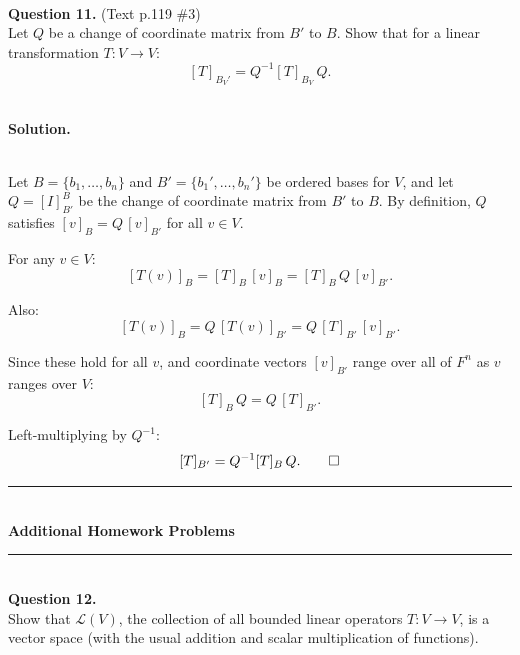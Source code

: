\documentclass{article}
\begin{document}
\bigskip


\hfill \break  $~\!\!$ \dotfill \medskip \\
\textbf{Question 11.} (Text p.119 \#3)\\
Let $Q$ be a change of coordinate matrix from $B'$ to $B$. Show that for a linear transformation $T: V \to V$:
\[
[T]_{B_V'} = Q^{-1}[T]_{B_V}\, Q.
\]

\noindent\\
\textbf{Solution.}\\
\quad\\
\begin{mdframed}[linewidth=1pt]
Let $B = \{b_1, \dots, b_n\}$ and $B' = \{b_1', \dots, b_n'\}$ be ordered bases for $V$, and let $Q = [I]_{B'}^{B}$ be the change of coordinate matrix from $B'$ to $B$. By definition, $Q$ satisfies $[v]_B = Q\,[v]_{B'}$ for all $v \in V$.

For any $v \in V$:
\[
[T(v)]_B = [T]_B\,[v]_B = [T]_B\, Q\, [v]_{B'}.
\]

Also:
\[
[T(v)]_B = Q\, [T(v)]_{B'} = Q\, [T]_{B'}\, [v]_{B'}.
\]

Since these hold for all $v$, and coordinate vectors $[v]_{B'}$ range over all of $F^n$ as $v$ ranges over $V$:
\[
[T]_B\, Q = Q\, [T]_{B'}.
\]

Left-multiplying by $Q^{-1}$:
\[
[T]_{B'} = Q^{-1}[T]_B\, Q. \qed
\]
\end{mdframed}

\bigskip


\bigskip
\begin{center}
\rule{0.5\textwidth}{1pt}\\[6pt]
\textbf{Additional Homework Problems}\\[2pt]
\rule{0.5\textwidth}{1pt}
\end{center}
\bigskip

\hfill \break  $~\!\!$ \dotfill \medskip \\
\textbf{Question 12.}\\
Show that $\mathcal{L}(V)$, the collection of all bounded linear operators $T: V \to V$, is a vector space (with the usual addition and scalar multiplication of functions).
\end{document}
